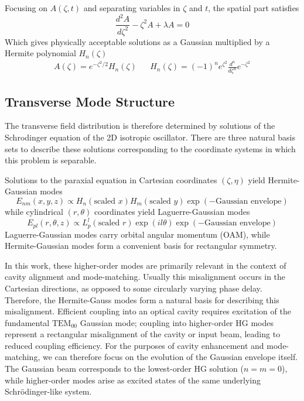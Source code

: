 Focusing on $A(\zeta,t)$ and separating variables in $\zeta$ and $t$, the spatial part satisfies
\begin{equation}
	\frac{d^2 A}{d\zeta^2} - \zeta^2 A + \lambda A = 0
\end{equation}
Which gives physically acceptable solutions as a Gaussian multiplied by a Hermite polynomial $H_n(\zeta)$
\begin{align}
	A(\zeta) = e^{-\zeta^2/2} H_n(\zeta) & & H_n(\zeta) = (-1)^n e^{\zeta^2}\frac{d^n}{d\zeta^n}e^{-\zeta^2}
\end{align}

\subsection{Transverse Mode Structure}

The transverse field distribution is therefore determined by solutions of the Schrodinger equation of the 2D isotropic oscillator. There are three natural basis sets to describe these solutions corresponding to the coordinate systems in which this problem is separable. 

Solutions to the paraxial equation in Cartesian coordinates $(\zeta, \eta)$ yield Hermite-Gaussian modes
\begin{equation}
	E_{nm}(x,y,z) \propto H_n(\text{scaled } x)H_m(\text{scaled } y)\exp(-\text{Gaussian envelope})
\end{equation}
while cylindrical $(r, \theta)$ coordinates yield Laguerre-Gaussian modes
\begin{equation}
	E_{pl}(r,\theta,z) \propto L_p^l(\text{scaled } r)\exp(il\theta)\exp(-\text{Gaussian envelope})
\end{equation}
Laguerre-Gaussian modes carry orbital angular momentum (OAM), while Hermite-Gaussian modes form a convenient basis for rectangular symmetry.

In this work, these higher-order modes are primarily relevant in the context of cavity alignment and mode-matching. Usually this misalignment occurs in the Cartesian directions, as opposed to some circularly varying phase delay. Therefore, the Hermite-Gauss modes form a natural basis for describing this misalignment. Efficient coupling into an optical cavity requires excitation of the fundamental $\mathrm{TEM}_{00}$ Gaussian mode; coupling into higher-order HG modes represent a rectangular misalignment of the cavity or input beam, leading to reduced coupling efficiency. For the purposes of cavity enhancement and mode-matching, we can therefore focus on the evolution of the Gaussian envelope itself. The Gaussian beam corresponds to the lowest-order HG solution ($n=m=0$), while higher-order modes arise as excited states of the same underlying Schrödinger-like system.

